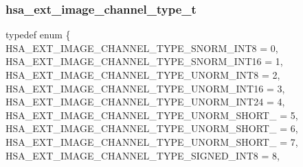 \documentclass[final]{book}
\newcommand{\reftyp}[1]{#1}
\newcommand{\refenu}[1]{\reftyp{#1}}
\newenvironment{mylongtable}{\rowcolors{0}{lightgray}{lightgray}\longtable} {
\endlongtable}
\begin{document}
\subsubsection{hsa_\-ext_\-image_\-channel_\-type_\-t}
\vspace{-5.5mm}\begin{mylongtable}{@{}p{\textwidth}}
\rule{0pt}{3ex}typedef enum \{\\\hspace{1.7em}\hypertarget{group__ext-images_1ggaa143aa6feeaf24103b886c571ace568fa59d72c5a5199e360e7a5773987696e42}{\refenu{HSA_\-EXT_\-IMAGE_\-CHANNEL_\-TYPE_\-SNORM_\-INT8}} = 0,\\
\hspace{1.7em}\hypertarget{group__ext-images_1ggaa143aa6feeaf24103b886c571ace568fa55ee5e3b2e6f3b593a9cf99f1f195b91}{\refenu{HSA_\-EXT_\-IMAGE_\-CHANNEL_\-TYPE_\-SNORM_\-INT16}} = 1,\\
\hspace{1.7em}\hypertarget{group__ext-images_1ggaa143aa6feeaf24103b886c571ace568fae3100c7304a6e1805711cd6965919e53}{\refenu{HSA_\-EXT_\-IMAGE_\-CHANNEL_\-TYPE_\-UNORM_\-INT8}} = 2,\\
\hspace{1.7em}\hypertarget{group__ext-images_1ggaa143aa6feeaf24103b886c571ace568fa9a27c2852fb86761dcbabfda391a8e73}{\refenu{HSA_\-EXT_\-IMAGE_\-CHANNEL_\-TYPE_\-UNORM_\-INT16}} = 3,\\
\hspace{1.7em}\hypertarget{group__ext-images_1ggaa143aa6feeaf24103b886c571ace568fa0b12c9e8bee88608297ecd9246ebf96a}{\refenu{HSA_\-EXT_\-IMAGE_\-CHANNEL_\-TYPE_\-UNORM_\-INT24}} = 4,\\
\hspace{1.7em}\hypertarget{group__ext-images_1ggaa143aa6feeaf24103b886c571ace568fa40e1eb056776d35da9f1dbaf2e264a19}{\refenu{HSA_\-EXT_\-IMAGE_\-CHANNEL_\-TYPE_\-UNORM_\-SHORT_}} = 5,\\
\hspace{1.7em}\hypertarget{group__ext-images_1ggaa143aa6feeaf24103b886c571ace568fa6165cebe82d6c2b115bbce04548f5626}{\refenu{HSA_\-EXT_\-IMAGE_\-CHANNEL_\-TYPE_\-UNORM_\-SHORT_}} = 6,\\
\hspace{1.7em}\hypertarget{group__ext-images_1ggaa143aa6feeaf24103b886c571ace568fad5193853cc5321dd50b16eb9e920237f}{\refenu{HSA_\-EXT_\-IMAGE_\-CHANNEL_\-TYPE_\-UNORM_\-SHORT_}} = 7,\\
\hspace{1.7em}\hypertarget{group__ext-images_1ggaa143aa6feeaf24103b886c571ace568fa39b7795d032ee6afc6c701b25632b7c0}{\refenu{HSA_\-EXT_\-IMAGE_\-CHANNEL_\-TYPE_\-SIGNED_\-INT8}} = 8,\\

\end{mylongtable}
\end{document}
